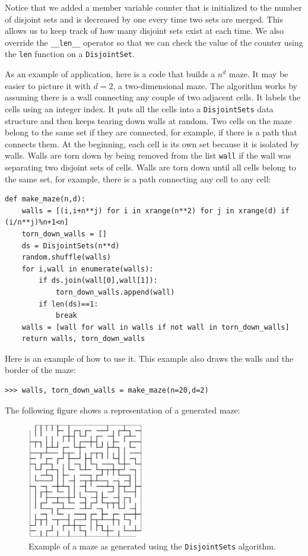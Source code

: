 \documentclass[justified,sixbynine]{tufte-book}
\def\ft{\small\tt}
\theoremstyle{plain}%
\theoremstyle{definition}
\theoremstyle{remark}
\begin{document}
\begin{fullwidth}
Notice that we added a member variable counter that is initialized to the number of disjoint sets and is decreased by one every time two sets are merged. This allows us to keep track of how many disjoint sets exist at each time. We also override the {\ft \_\_len\_\_} operator so that we can check the value of the counter using the {\ft len} function on a {\ft DisjointSet}.

As an example of application, here is a code that builds a $n^d$ maze. It may be easier to picture it with $d=2$, a two-dimensional maze. The algorithm works by assuming there is a wall connecting any couple of two adjacent cells. It labels the cells using an integer index.
It puts all the cells into a {\ft DisjointSets} data structure and then keeps tearing down walls at random. Two cells on the maze belong to the same set if they are connected, for example, if there is a path that connects them. At the beginning, each cell is its own set because it is isolated by walls.
Walls are torn down by being removed from the list {\ft wall} if the wall was separating two disjoint sets of cells. Walls are torn down until all cells belong to the same set, for example, there is a path connecting any cell to any cell:

\begin{lstlisting}
def make_maze(n,d):
    walls = [(i,i+n**j) for i in xrange(n**2) for j in xrange(d) if (i/n**j)%n+1<n]
    torn_down_walls = []
    ds = DisjointSets(n**d)
    random.shuffle(walls)
    for i,wall in enumerate(walls):
        if ds.join(wall[0],wall[1]):
            torn_down_walls.append(wall)
        if len(ds)==1:
            break
    walls = [wall for wall in walls if not wall in torn_down_walls]
    return walls, torn_down_walls
\end{lstlisting}

Here is an example of how to use it. This example also draws the walls and the border of the maze:

\begin{lstlisting}
>>> walls, torn_down_walls = make_maze(n=20,d=2)
\end{lstlisting}

The following figure shows a representation of a generated maze:

\begin{figure}[ht]
\centering\includegraphics[width=2in]{images/maze1.png}
\caption{Example of a maze as generated using the {\ft DisjointSets} algorithm.}
\end{figure}


\end{fullwidth}
\end{document}
